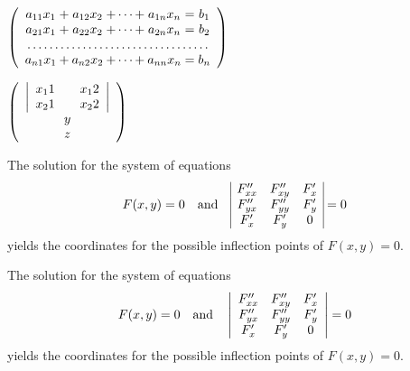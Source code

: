 \documentclass{article}
\begin{document}
    \begin{math}
        \left (
        \begin{array}{c@{\:+\:}c@{\:+\cdots+\:}c@{\;=\;}c}
            a_{11}x_1 & a_{12}x_2 & a_{1n}x_n & b_1 \\
            a_{21}x_1 & a_{22}x_2 & a_{2n}x_n & b_2 \\
            \multicolumn{4}{c}{\dotfill} \\
            a_{n1}x_1 & a_{n2}x_2 & a_{nn}x_n & b_n \\
        \end{array}
        \right )
    \end{math}

    \begin{math}
        \left (
        \begin{array}{c}
            \left |
                \begin{array}{c@{\qquad}c}
                    x_11 & x_12 \\
                    x_21 & x_22 \\
                \end{array}
            \right | \\
            y \\
            z \\
        \end{array}
        \right )
    \end{math}

    The solution for the system of equations
    \begin{equation}
        F(x,y)=0\quad \mbox{and}\quad
        \begin{array}{|*{2}{c@{\quad}}c|}
            F_{xx}'' & F_{xy}'' & F_{x}' \\
            F_{yx}'' & F_{yy}'' & F_{y}' \\
            F_{x}'   & F_{y}'   & 0 \\
        \end{array} = 0
    \end{equation}
    yields the coordinates for the possible inflection points of $F(x,y)=0$.

    The solution for the system of equations
    \begin{equation}
        F(x,y)=0\quad \mbox{and}\quad
        \left |
        \begin{array}{*{2}{c@{\quad}}c}
            F_{xx}'' & F_{xy}'' & F_{x}' \\
            F_{yx}'' & F_{yy}'' & F_{y}' \\
            F_{x}'   & F_{y}'   & 0 \\
        \end{array}
        \right | = 0
    \end{equation}
    yields the coordinates for the possible inflection points of $F(x,y)=0$.
\end{document}
